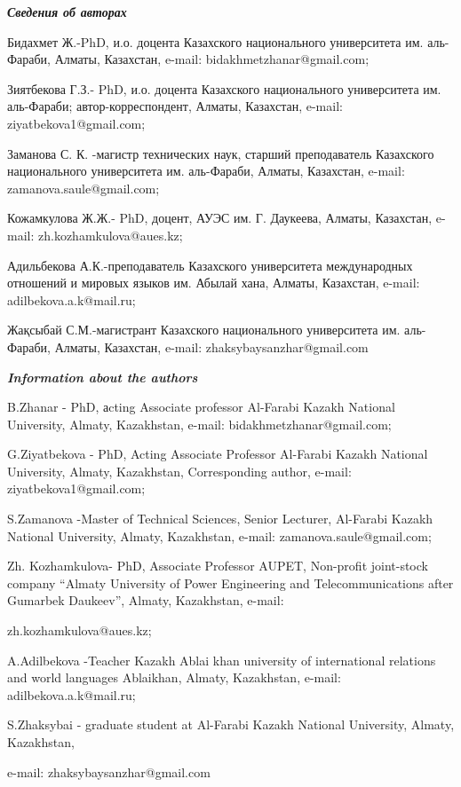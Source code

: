 \emph{{\bfseries Сведения об авторах}}

\begin{noparindent}
Бидахмет Ж.-PhD, и.о. доцента Казахского национального университета им.
аль-Фараби, Алматы, Казахстан, e-mail: bidakhmetzhanar@gmail.com;

Зиятбекова Г.З.- PhD, и.о. доцента Казахского национального университета
им. аль-Фараби; автор-корреспондент, Алматы, Казахстан, e-mail:
ziyatbekova1@gmail.com;

Заманова С. К. -магистр технических наук, старший преподаватель
Казахского национального университета им. аль-Фараби, Алматы, Казахстан,
e-mail: zamanova.saule@gmail.com;

Кожамкулова Ж.Ж.- PhD, доцент, АУЭС им. Г. Даукеева, Алматы, Казахстан,
e-mail: zh.kozhamkulova@aues.kz;

Адильбекова А.К.-преподаватель Казахского университета международных
отношений и мировых языков им. Абылай хана, Алматы, Казахстан, e-mail:
adilbekova.a.k@mail.ru;

Жақсыбай С.М.-магистрант Казахского национального университета им.
аль-Фараби, Алматы, Казахстан, e-mail: zhaksybaysanzhar@gmail.com
\end{noparindent}

\emph{{\bfseries Information about the authors}}

\begin{noparindent}
B.Zhanar - PhD, аcting Associate professor Al-Farabi Kazakh National
University, Almaty, Kazakhstan, e-mail: bidakhmetzhanar@gmail.com;

G.Ziyatbekova - PhD, Acting Associate Professor Al-Farabi Kazakh
National University, Almaty, Kazakhstan, Corresponding author, e-mail:
ziyatbekova1@gmail.com;

S.Zamanova -Master of Technical Sciences, Senior Lecturer, Al-Farabi
Kazakh National University, Almaty, Kazakhstan, e-mail:
zamanova.saule@gmail.com;

Zh. Kozhamkulova- PhD, Associate Professor AUPET, Non-profit joint-stock
company ``Almaty University of Power Engineering and Telecommunications
after Gumarbek Daukeev'', Almaty, Kazakhstan, e-mail:

zh.kozhamkulova@aues.kz;

A.Adilbekova -Teacher Kazakh Ablai khan university of international
relations and world languages Ablaikhan, Almaty, Kazakhstan, e-mail:
adilbekova.a.k@mail.ru;

S.Zhaksybai - graduate student at Al-Farabi Kazakh National University,
Almaty, Kazakhstan,

e-mail: zhaksybaysanzhar@gmail.com
\end{noparindent}

